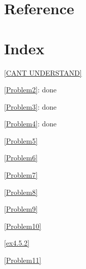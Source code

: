 \documentclass[11pt]{article}
\begin{document}
\section{Reference}
\label{sec:org265e579}


\section{Index}
\label{sec:org0ff9080}
\renewcommand{\indexname}{}
\printindex
\appendix
\ref{CANT UNDERSTAND}


\ref{Problem2}: done


\ref{Problem3}: done


\ref{Problem4}: done


\ref{Problem5}

\ref{Problem6}

\ref{Problem7}

\ref{Problem8}

\ref{Problem9}

\ref{Problem10}

\ref{ex4.5.2}

\ref{Problem11}
\end{document}
